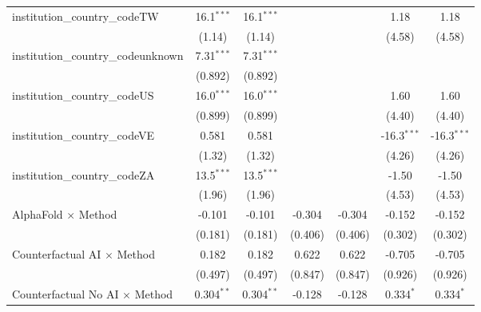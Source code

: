 \begin{tabular}{lcccccc}
   institution\_country\_codeTW          & 16.1$^{***}$  & 16.1$^{***}$  &               &               & 1.18          & 1.18\\   
                                         & (1.14)        & (1.14)        &               &               & (4.58)        & (4.58)\\   
   institution\_country\_codeunknown     & 7.31$^{***}$  & 7.31$^{***}$  &               &               &               &   \\   
                                         & (0.892)       & (0.892)       &               &               &               &   \\   
   institution\_country\_codeUS          & 16.0$^{***}$  & 16.0$^{***}$  &               &               & 1.60          & 1.60\\   
                                         & (0.899)       & (0.899)       &               &               & (4.40)        & (4.40)\\   
   institution\_country\_codeVE          & 0.581         & 0.581         &               &               & -16.3$^{***}$ & -16.3$^{***}$\\   
                                         & (1.32)        & (1.32)        &               &               & (4.26)        & (4.26)\\   
   institution\_country\_codeZA          & 13.5$^{***}$  & 13.5$^{***}$  &               &               & -1.50         & -1.50\\   
                                         & (1.96)        & (1.96)        &               &               & (4.53)        & (4.53)\\   
   AlphaFold $\times$ Method             & -0.101        & -0.101        & -0.304        & -0.304        & -0.152        & -0.152\\   
                                         & (0.181)       & (0.181)       & (0.406)       & (0.406)       & (0.302)       & (0.302)\\   
   Counterfactual AI $\times$ Method     & 0.182         & 0.182         & 0.622         & 0.622         & -0.705        & -0.705\\   
                                         & (0.497)       & (0.497)       & (0.847)       & (0.847)       & (0.926)       & (0.926)\\   
   Counterfactual No AI $\times$ Method  & 0.304$^{**}$  & 0.304$^{**}$  & -0.128        & -0.128        & 0.334$^{*}$   & 0.334$^{*}$\\   

\end{tabular}
